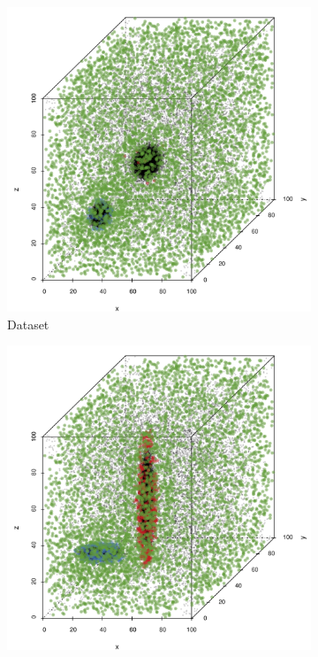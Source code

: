 	\begin{figure}
		\centering
		\begin{subfigure}{0.23\textwidth}
			\centering
			\includegraphics[keepaspectratio=true, width=\textwidth, height=0.23\textheight]{discussion/img/ferdosi_2_60000_anisotropy.png}
			\caption{Dataset \ferdosiTwo}
			\label{fig:discussion:anisotropy:ferdosi2}
		\end{subfigure}
		\begin{subfigure}{0.23\textwidth}
			\centering
			\includegraphics[keepaspectratio=true, width=\textwidth, height=0.23\textheight]{discussion/img/baakman_2_60000_anisotropy.png}

\end{subfigure}
\end{figure}

